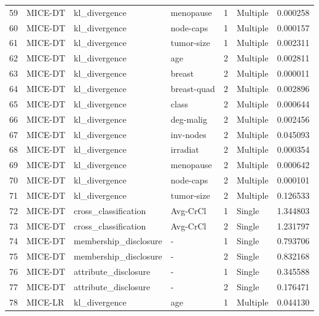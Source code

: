 \begin{tabular}{llllrlr}
59  &  MICE-DT &          kl\_divergence &    menopause &    1 &  Multiple &  0.000258 \\
60  &  MICE-DT &          kl\_divergence &    node-caps &    1 &  Multiple &  0.000157 \\
61  &  MICE-DT &          kl\_divergence &   tumor-size &    1 &  Multiple &  0.002311 \\
62  &  MICE-DT &          kl\_divergence &          age &    2 &  Multiple &  0.002811 \\
63  &  MICE-DT &          kl\_divergence &       breast &    2 &  Multiple &  0.000011 \\
64  &  MICE-DT &          kl\_divergence &  breast-quad &    2 &  Multiple &  0.002896 \\
65  &  MICE-DT &          kl\_divergence &        class &    2 &  Multiple &  0.000644 \\
66  &  MICE-DT &          kl\_divergence &    deg-malig &    2 &  Multiple &  0.002456 \\
67  &  MICE-DT &          kl\_divergence &    inv-nodes &    2 &  Multiple &  0.045093 \\
68  &  MICE-DT &          kl\_divergence &     irradiat &    2 &  Multiple &  0.000354 \\
69  &  MICE-DT &          kl\_divergence &    menopause &    2 &  Multiple &  0.000642 \\
70  &  MICE-DT &          kl\_divergence &    node-caps &    2 &  Multiple &  0.000101 \\
71  &  MICE-DT &          kl\_divergence &   tumor-size &    2 &  Multiple &  0.126533 \\
72  &  MICE-DT &   cross\_classification &     Avg-CrCl &    1 &    Single &  1.344803 \\
73  &  MICE-DT &   cross\_classification &     Avg-CrCl &    2 &    Single &  1.231797 \\
74  &  MICE-DT &  membership\_disclosure &            - &    1 &    Single &  0.793706 \\
75  &  MICE-DT &  membership\_disclosure &            - &    2 &    Single &  0.832168 \\
76  &  MICE-DT &   attribute\_disclosure &            - &    1 &    Single &  0.345588 \\
77  &  MICE-DT &   attribute\_disclosure &            - &    2 &    Single &  0.176471 \\
78  &  MICE-LR &          kl\_divergence &          age &    1 &  Multiple &  0.044130 \\

\end{tabular}
